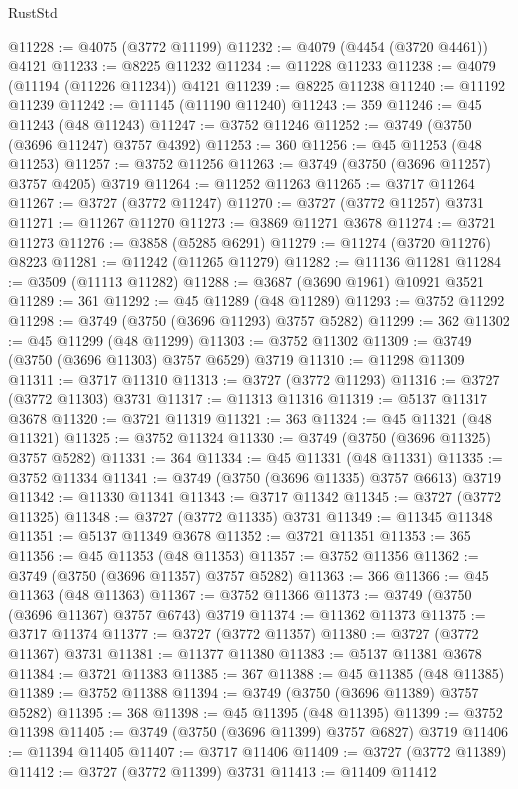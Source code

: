 \begin{lexlean}{RustStd}
\begin{coremodule}
@11228 := @4075 (@3772 @11199)
@11232 := @4079 (@4454 (@3720 @4461)) @4121
@11233 := @8225 @11232
@11234 := @11228 @11233
@11238 := @4079 (@11194 (@11226 @11234)) @4121
@11239 := @8225 @11238
@11240 := @11192 @11239
@11242 := @11145 (@11190 @11240)
@11243 := 359
@11246 := @45 @11243 (@48 @11243)
@11247 := @3752 @11246
@11252 := @3749 (@3750 (@3696 @11247) @3757 @4392)
@11253 := 360
@11256 := @45 @11253 (@48 @11253)
@11257 := @3752 @11256
@11263 := @3749 (@3750 (@3696 @11257) @3757 @4205) @3719
@11264 := @11252 @11263
@11265 := @3717 @11264
@11267 := @3727 (@3772 @11247)
@11270 := @3727 (@3772 @11257) @3731
@11271 := @11267 @11270
@11273 := @3869 @11271 @3678
@11274 := @3721 @11273
@11276 := @3858 (@5285 @6291)
@11279 := @11274 (@3720 @11276) @8223
@11281 := @11242 (@11265 @11279)
@11282 := @11136 @11281
@11284 := @3509 (@11113 @11282)
@11288 := @3687 (@3690 @1961) @10921 @3521
@11289 := 361
@11292 := @45 @11289 (@48 @11289)
@11293 := @3752 @11292
@11298 := @3749 (@3750 (@3696 @11293) @3757 @5282)
@11299 := 362
@11302 := @45 @11299 (@48 @11299)
@11303 := @3752 @11302
@11309 := @3749 (@3750 (@3696 @11303) @3757 @6529) @3719
@11310 := @11298 @11309
@11311 := @3717 @11310
@11313 := @3727 (@3772 @11293)
@11316 := @3727 (@3772 @11303) @3731
@11317 := @11313 @11316
@11319 := @5137 @11317 @3678
@11320 := @3721 @11319
@11321 := 363
@11324 := @45 @11321 (@48 @11321)
@11325 := @3752 @11324
@11330 := @3749 (@3750 (@3696 @11325) @3757 @5282)
@11331 := 364
@11334 := @45 @11331 (@48 @11331)
@11335 := @3752 @11334
@11341 := @3749 (@3750 (@3696 @11335) @3757 @6613) @3719
@11342 := @11330 @11341
@11343 := @3717 @11342
@11345 := @3727 (@3772 @11325)
@11348 := @3727 (@3772 @11335) @3731
@11349 := @11345 @11348
@11351 := @5137 @11349 @3678
@11352 := @3721 @11351
@11353 := 365
@11356 := @45 @11353 (@48 @11353)
@11357 := @3752 @11356
@11362 := @3749 (@3750 (@3696 @11357) @3757 @5282)
@11363 := 366
@11366 := @45 @11363 (@48 @11363)
@11367 := @3752 @11366
@11373 := @3749 (@3750 (@3696 @11367) @3757 @6743) @3719
@11374 := @11362 @11373
@11375 := @3717 @11374
@11377 := @3727 (@3772 @11357)
@11380 := @3727 (@3772 @11367) @3731
@11381 := @11377 @11380
@11383 := @5137 @11381 @3678
@11384 := @3721 @11383
@11385 := 367
@11388 := @45 @11385 (@48 @11385)
@11389 := @3752 @11388
@11394 := @3749 (@3750 (@3696 @11389) @3757 @5282)
@11395 := 368
@11398 := @45 @11395 (@48 @11395)
@11399 := @3752 @11398
@11405 := @3749 (@3750 (@3696 @11399) @3757 @6827) @3719
@11406 := @11394 @11405
@11407 := @3717 @11406
@11409 := @3727 (@3772 @11389)
@11412 := @3727 (@3772 @11399) @3731
@11413 := @11409 @11412

\end{coremodule}
\end{lexlean}
